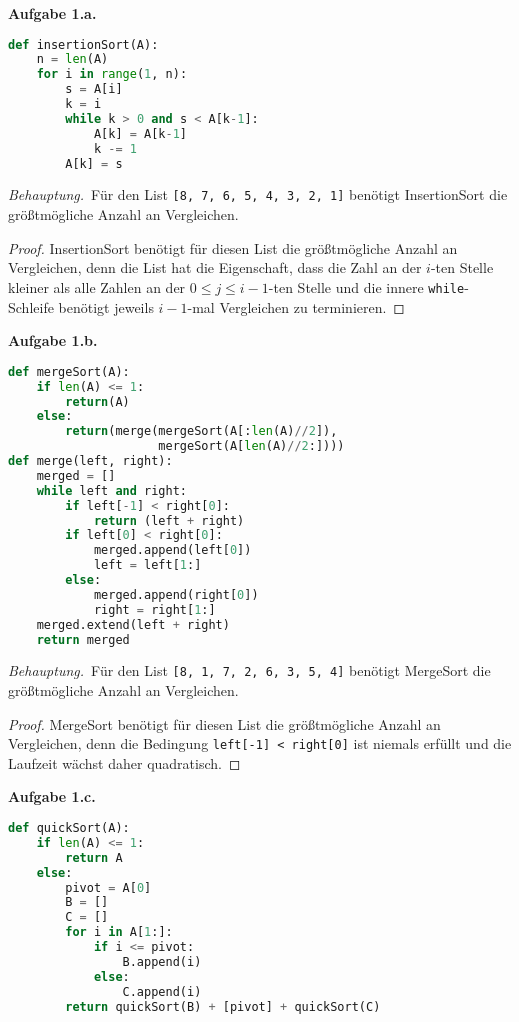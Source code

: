 \documentclass[12pt]{extarticle}
\newcommand{\aufgn}[1]{\textbf{Aufgabe #1.}}
\newcommand{\beh}{\textit{Behauptung.}\ }
\begin{document}
\aufgn{1.a}

\begin{lstlisting}[language=Python]
def insertionSort(A):
    n = len(A)
    for i in range(1, n):
        s = A[i]
        k = i
        while k > 0 and s < A[k-1]:
            A[k] = A[k-1]
            k -= 1
        A[k] = s
\end{lstlisting}

\beh Für den List \texttt{[8, 7, 6, 5, 4, 3, 2, 1]}
benötigt InsertionSort die größtmögliche Anzahl an
Vergleichen.

\begin{proof}
InsertionSort benötigt für diesen List die größtmögliche
Anzahl an Vergleichen, denn die List hat die
Eigenschaft, dass die Zahl an der \(i\)-ten Stelle kleiner als
alle Zahlen an der \(0 \le j \le i-1\)-ten Stelle und
die innere \texttt{while}-Schleife benötigt jeweils
\(i-1\)-mal Vergleichen zu terminieren.
\end{proof}

\aufgn{1.b}

\begin{lstlisting}[language=Python]
def mergeSort(A):
    if len(A) <= 1:
        return(A)
    else:
        return(merge(mergeSort(A[:len(A)//2]),
                     mergeSort(A[len(A)//2:])))
def merge(left, right):
    merged = []
    while left and right:
        if left[-1] < right[0]:
            return (left + right)
        if left[0] < right[0]:
            merged.append(left[0])
            left = left[1:]
        else:
            merged.append(right[0])
            right = right[1:]
    merged.extend(left + right)
    return merged
\end{lstlisting}

\beh Für den List \texttt{[8, 1, 7, 2, 6, 3, 5, 4]}
benötigt MergeSort die größtmögliche Anzahl an
Vergleichen.

\begin{proof}
MergeSort benötigt für diesen List die größtmögliche
Anzahl an Vergleichen, denn die Bedingung
\texttt{left[-1] < right[0]} ist niemals erfüllt und die
Laufzeit wächst daher quadratisch.
\end{proof}

\aufgn{1.c}

\begin{lstlisting}[language=Python]
def quickSort(A):
    if len(A) <= 1:
        return A
    else:
        pivot = A[0]
        B = []
        C = []
        for i in A[1:]:
            if i <= pivot:
                B.append(i)
            else:
                C.append(i)
        return quickSort(B) + [pivot] + quickSort(C)
\end{lstlisting}
\end{document}
